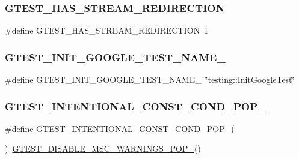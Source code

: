 \subsubsection{\texorpdfstring{GTEST\_HAS\_STREAM\_REDIRECTION}{GTEST\_HAS\_STREAM\_REDIRECTION}}
{\footnotesize\ttfamily \#define G\+T\+E\+S\+T\+\_\+\+H\+A\+S\+\_\+\+S\+T\+R\+E\+A\+M\+\_\+\+R\+E\+D\+I\+R\+E\+C\+T\+I\+ON~1}

\mbox{\label{googletest-master_2googletest_2include_2gtest_2internal_2gtest-port_8h_aa5e27ad4f88278501ef71bd9ddbb44c6}} 
\subsubsection{\texorpdfstring{GTEST\_INIT\_GOOGLE\_TEST\_NAME\_}{GTEST\_INIT\_GOOGLE\_TEST\_NAME\_}}
{\footnotesize\ttfamily \#define G\+T\+E\+S\+T\+\_\+\+I\+N\+I\+T\+\_\+\+G\+O\+O\+G\+L\+E\+\_\+\+T\+E\+S\+T\+\_\+\+N\+A\+M\+E\+\_\+~\char`\"{}testing\+::\+Init\+Google\+Test\char`\"{}}

\mbox{\label{googletest-master_2googletest_2include_2gtest_2internal_2gtest-port_8h_ad115e2c466f7e8a32f1cf23ef2e5f220}} 
\subsubsection{\texorpdfstring{GTEST\_INTENTIONAL\_CONST\_COND\_POP\_}{GTEST\_INTENTIONAL\_CONST\_COND\_POP\_}}
{\footnotesize\ttfamily \#define G\+T\+E\+S\+T\+\_\+\+I\+N\+T\+E\+N\+T\+I\+O\+N\+A\+L\+\_\+\+C\+O\+N\+S\+T\+\_\+\+C\+O\+N\+D\+\_\+\+P\+O\+P\+\_\+(\begin{DoxyParamCaption}{ }\end{DoxyParamCaption})~\mbox{\hyperlink{_obj__test_2lib_2googletest-release-1_88_81_2googletest_2include_2gtest_2internal_2gtest-port_8h_ab4c44546d6d9aced68993b87b608fc06}{G\+T\+E\+S\+T\+\_\+\+D\+I\+S\+A\+B\+L\+E\+\_\+\+M\+S\+C\+\_\+\+W\+A\+R\+N\+I\+N\+G\+S\+\_\+\+P\+O\+P\+\_\+}}()}

